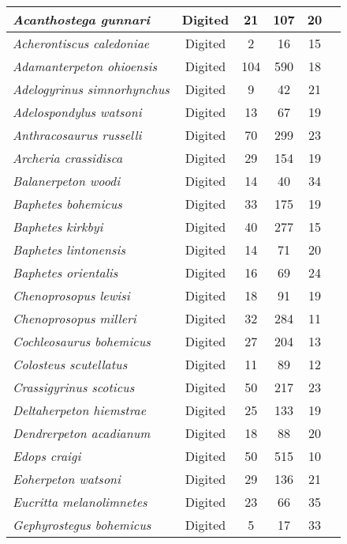 \begin{tabular}{|L{4.5cm}|c|c|c|c|L{4.5cm}|}
\textit{Acanthostega gunnari}&Digited&21&107&20&\\\hline
\textit{Acherontiscus caledoniae}&Digited&2&16&15&\\\hline
\textit{Adamanterpeton ohioensis}&Digited&104&590&18&\\\hline
\textit{Adelogyrinus simnorhynchus}&Digited&9&42&21&\\\hline
\textit{Adelospondylus watsoni}&Digited&13&67&19&\\\hline
\textit{Anthracosaurus russelli}&Digited&70&299&23&\\\hline
\textit{Archeria crassidisca}&Digited&29&154&19&\\\hline
\textit{Balanerpeton woodi}&Digited&14&40&34&\\\hline
\textit{Baphetes bohemicus}&Digited&33&175&19&\\\hline
\textit{Baphetes kirkbyi}&Digited&40&277&15&\\\hline
\textit{Baphetes lintonensis}&Digited&14&71&20&\\\hline
\textit{Baphetes orientalis}&Digited&16&69&24&\\\hline
\textit{Chenoprosopus lewisi}&Digited&18&91&19&\\\hline
\textit{Chenoprosopus milleri}&Digited&32&284&11&\\\hline
\textit{Cochleosaurus bohemicus}&Digited&27&204&13&\\\hline
\textit{Colosteus scutellatus}&Digited&11&89&12&\\\hline
\textit{Crassigyrinus scoticus}&Digited&50&217&23&\\\hline
\textit{Deltaherpeton hiemstrae}&Digited&25&133&19&\\\hline
\textit{Dendrerpeton acadianum}&Digited&18&88&20&\\\hline
\textit{Edops craigi}&Digited&50&515&10&\\\hline
\textit{Eoherpeton watsoni}&Digited&29&136&21&\\\hline
\textit{Eucritta melanolimnetes}&Digited&23&66&35&\\\hline
\textit{Gephyrostegus bohemicus}&Digited&5&17&33&\\\hline

\end{tabular}
